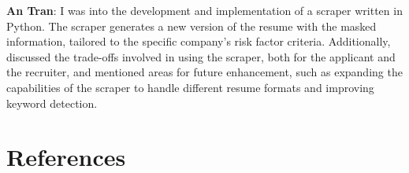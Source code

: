 \documentclass{article}
\begin{document}
\textbf{An Tran}: I was into the development and implementation of a scraper written in Python. The scraper generates a new version of the resume with the masked information, tailored to the specific company's risk factor criteria. Additionally, discussed the trade-offs involved in using the scraper, both for the applicant and the recruiter, and mentioned areas for future enhancement, such as expanding the capabilities of the scraper to handle different resume formats and improving keyword detection.



























































\section*{References}

\medskip
\end{document}
